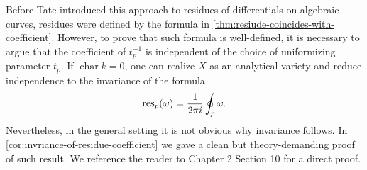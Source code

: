 \begin{remark}\label{rem:previouses-approaches-residues}
	Before Tate introduced this approach to residues of differentials on algebraic curves, residues were defined by the formula in \cref{thm:resiude-coincides-with-coefficient}. However, to prove that such formula is well-defined, it is necessary to argue that the coefficient of $t_{p}^{-1}$ is independent of the choice of uniformizing parameter $t_{p}$. If $\operatorname{char}k = 0$, one can realize $X$ as an analytical variety and reduce independence to the invariance of the formula
	\[
		\operatorname{res}_{p}(\omega) = \frac{1}{2\pi i}\oint_{p} \omega.
	\]
	Nevertheless, in the general setting it is not obvious why invariance follows. In \cref{cor:invriance-of-residue-coefficient} we gave a clean but theory-demanding proof of such result. We reference the reader to \cite{serre} Chapter 2 Section 10 for a direct proof.
\end{remark}
